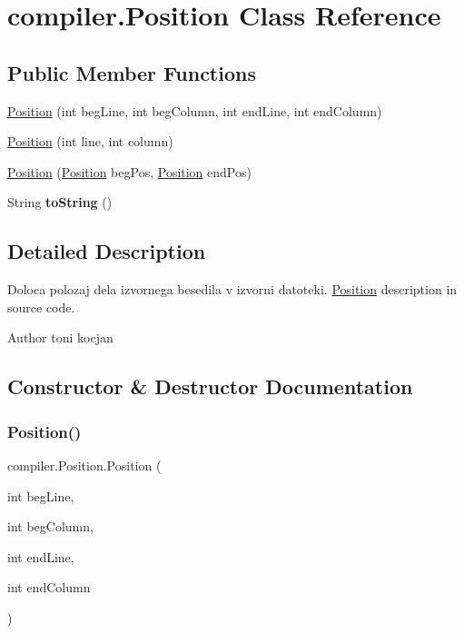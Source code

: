 \hypertarget{classcompiler_1_1_position}{}\section{compiler.\+Position Class Reference}
\label{classcompiler_1_1_position}
\subsection*{Public Member Functions}
\begin{DoxyCompactItemize}
\item 
\hyperlink{classcompiler_1_1_position_af11be91faac80a8921db8e690540dc8c}{Position} (int beg\+Line, int beg\+Column, int end\+Line, int end\+Column)
\item 
\hyperlink{classcompiler_1_1_position_a0199312c011f954b41bc5477e50ebb5a}{Position} (int line, int column)
\item 
\hyperlink{classcompiler_1_1_position_a97b1e9c139815cb6654f4afe93d9cd77}{Position} (\hyperlink{classcompiler_1_1_position}{Position} beg\+Pos, \hyperlink{classcompiler_1_1_position}{Position} end\+Pos)
\item 
\mbox{\label{classcompiler_1_1_position_a9104fb8b5cd14bf3de03a50ec6eecd39}} 
String {\bfseries to\+String} ()
\end{DoxyCompactItemize}


\subsection{Detailed Description}
Doloca polozaj dela izvornega besedila v izvorni datoteki. \hyperlink{classcompiler_1_1_position}{Position} description in source code. \begin{DoxyAuthor}{Author}
toni kocjan 
\end{DoxyAuthor}


\subsection{Constructor \& Destructor Documentation}
\mbox{\label{classcompiler_1_1_position_af11be91faac80a8921db8e690540dc8c}} 
\subsubsection{\texorpdfstring{Position()}{Position()}\hspace{0.1cm}{\footnotesize\ttfamily [1/3]}}
{\footnotesize\ttfamily compiler.\+Position.\+Position (\begin{DoxyParamCaption}\item[{int}]{beg\+Line,  }\item[{int}]{beg\+Column,  }\item[{int}]{end\+Line,  }\item[{int}]{end\+Column }\end{DoxyParamCaption})}

